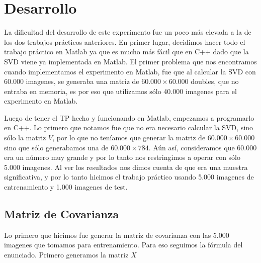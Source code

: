 \section{Desarrollo}
La dificultad del desarrollo de este experimento fue un poco m\'as elevada a la de los dos trabajos pr\'acticos anteriores. En primer lugar, decidimos hacer todo el trabajo pr\'actico en Matlab ya que es mucho m\'as f\'acil que en C++ dado que la SVD viene ya implementada en Matlab. El primer problema que nos encontramos cuando implementamos el experimento en Matlab, fue que al calcular la SVD con 60.000 imagenes, se generaba una matriz de $60.000 \times 60.000$ doubles, que no entraba en memoria, es por eso que utilizamos s\'olo 40.000 imagenes para el experimento en Matlab.

Luego de tener el TP hecho y funcionando en Matlab, empezamos a programarlo en C++. Lo primero que notamos fue que no era necesario calcular la SVD, sino s\'olo la matriz $V$, por lo que no ten\'iamos que generar la matriz de $60.000 \times 60.000$ sino que s\'olo generabamos una de $60.000 \times 784$. A\'un as\'i, consideramos que 60.000 era un n\'umero muy grande y por lo tanto nos restringimos a operar con s\'olo 5.000 imagenes. Al ver los resultados nos dimos cuenta de que era una muestra significativa, y por lo tanto hicimos el trabajo pr\'actico usando 5.000 imagenes de entrenamiento y 1.000 imagenes de test.

\subsection{Matriz de Covarianza}
Lo primero que hicimos fue generar la matriz de covarianza con las 5.000 imagenes que tomamos para entrenamiento. Para eso seguimos la f\'ormula del enunciado. Primero generamos la matriz $X$
